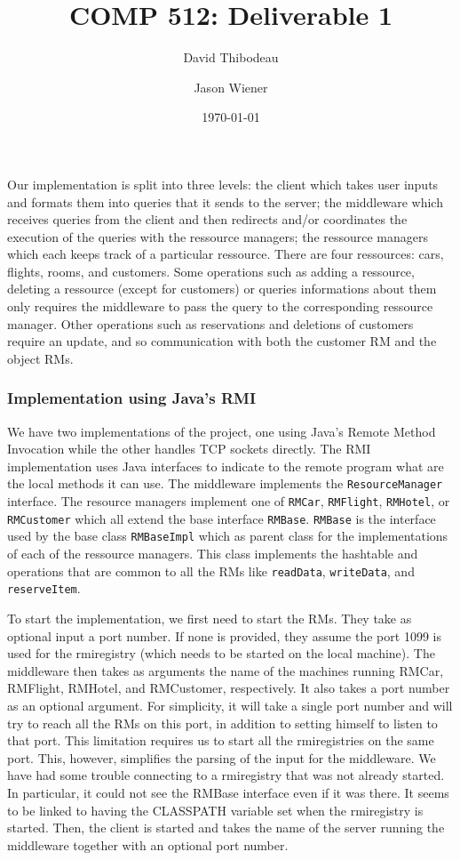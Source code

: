 \documentclass[12pt]{article}
\author{David Thibodeau \and Jason Wiener}
\title{COMP 512: Deliverable 1}
\date{\today}
\theoremstyle{plain}%
\theoremstyle{definition}
\theoremstyle{remark}
\newcommand{\java}[1]{{\lstinline!#1!}}
\begin{document}
\maketitle

Our implementation is split into three levels: the client which takes
user inputs and formats them into queries that it sends to the server;
the middleware which receives queries from the client and then redirects and/or
coordinates the execution of the queries with the ressource managers;
the ressource managers which each keeps track of a particular
ressource. There are four ressources: cars, flights, rooms, and
customers. Some operations such as adding a ressource, deleting a
ressource (except for customers) or queries informations about them
only requires the middleware to pass the query to the corresponding
ressource manager. Other operations such as reservations and deletions
of customers require an update, and so communication with both the
customer RM and the object RMs.

\subsubsection*{Implementation using Java's RMI}
We have two implementations of the project, one using Java's Remote
Method Invocation while the other handles TCP sockets directly. The
RMI implementation uses Java interfaces to indicate to the remote
program what are the local methods it can use. The middleware
implements the \java{ResourceManager} interface. The resource managers
implement one of \java{RMCar}, \java{RMFlight}, \java{RMHotel}, or
\java{RMCustomer} which all extend the base interface \java{RMBase}.
\java{RMBase} is the interface used by the base class
\java{RMBaseImpl} which as parent class for the implementations of
each of the ressource managers. This class implements the hashtable
and operations that are common to all the RMs like \java{readData},
\java{writeData}, and \java{reserveItem}.

To start the implementation, we first need to start the RMs. They take
as optional input a port number. If none is provided, they assume the
port 1099 is used for the rmiregistry (which needs to be started on
the local machine). The middleware then takes as arguments the name of
the machines running RMCar, RMFlight, RMHotel, and RMCustomer,
respectively. It also takes a port number as an optional argument. For
simplicity, it will take a single port number and will try to reach
all the RMs on this port, in addition to setting himself to listen to
that port. This limitation requires us to start all the rmiregistries
on the same port. This, however, simplifies the parsing of the input
for the middleware. We have had some trouble connecting to a
rmiregistry that was not already started. In particular, it could not
see the RMBase interface even if it was there. It seems to be linked to
having the CLASSPATH variable set when the rmiregistry is started.
Then, the client is started and takes the name of the server running
the middleware together with an optional port number.
\end{document}
